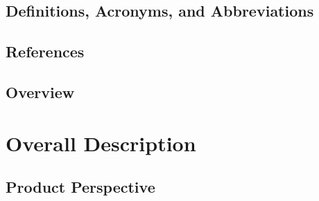 \documentclass{article}
\begin{document}
        \subsection{Definitions, Acronyms, and Abbreviations}
        \subsection{References}
        \subsection{Overview}
	
	\section{Overall Description}
		
        \subsection{Product Perspective}
        
\end{document}
